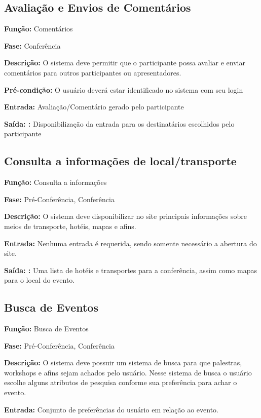 \documentclass[letter]{article}
\begin{document}
\subsection{ Avaliação e Envios de Comentários}

\textbf{Função:} Comentários

\textbf{Fase: } Conferência

\textbf{Descrição: } O sistema deve permitir que o participante possa avaliar e enviar comentários para outros participantes ou apresentadores.

\textbf{Pré-condição: } O usuário deverá estar identificado no sistema com seu login

\textbf{Entrada: } Avaliação/Comentário gerado pelo participante

\textbf{Saída: :} Disponibilização da entrada para os destinatários escolhidos pelo participante


\subsection{ Consulta a informações de local/transporte}

\textbf{Função:} Consulta a informações

\textbf{Fase: } Pré-Conferência, Conferência

\textbf{Descrição: } O sistema deve disponibilizar no site principais informações sobre meios de transporte, hotéis, mapas e afins.

\textbf{Entrada: } Nenhuma entrada é requerida, sendo somente necessário a abertura do site.

\textbf{Saída: :} Uma lista de hotéis e transportes para a conferência, assim como mapas para o local do evento.


\subsection{ Busca de Eventos}

\textbf{Função:} Busca de Eventos

\textbf{Fase: } Pré-Conferência, Conferência

\textbf{Descrição: } O sistema deve possuir um sistema de busca para que palestras, workshops e afins sejam achados pelo usuário. Nesse sistema de busca o usuário escolhe alguns atributos de pesquisa conforme sua preferência para achar o evento.

\textbf{Entrada: } Conjunto de preferências do usuário em relação ao evento.
\end{document}
